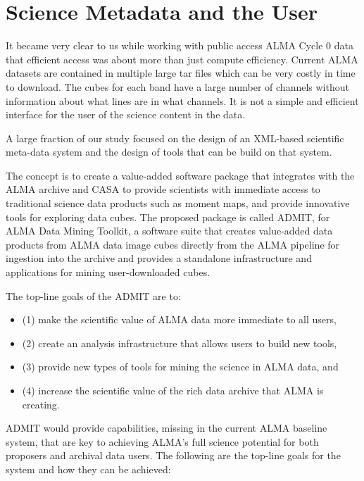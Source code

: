 \section{Science Metadata and the User}

It became very clear to us while
working with public access ALMA Cycle 0 data that efficient
access was about more than just compute efficiency. Current
ALMA datasets are contained in multiple large tar files which
can be very costly in time to download. The cubes for each band
have a large number of channels without information about what
lines are in what channels. It is not a simple and efficient
interface for the user of the science content in the data.

A large fraction of our study focused on the design of an
XML-based scientific meta-data system and the design of
tools that can be build on that system.

The concept is to create a value-added software package that integrates with the ALMA 
archive and CASA to provide scientists with immediate access to traditional science 
data products such as moment maps, and provide innovative tools for exploring data cubes. 
The proposed package is called ADMIT, for ALMA Data Mining Toolkit, a software suite 
that creates value-added data products from ALMA data image cubes directly from the 
ALMA pipeline for ingestion into the archive and provides a standalone 
infrastructure and applications for mining user-downloaded cubes. 

The top-line goals of the ADMIT are to: 

\begin{itemize}
\item[] (1) make the scientific value of ALMA data more immediate to all users, 
\item[] (2) create an analysis infrastructure that allows users to build new tools,
\item[] (3) provide new types of tools for mining the science in ALMA data, and
\item[] (4) increase the scientific value of the rich data archive that ALMA is creating.
\end{itemize}

ADMIT would provide capabilities, missing in the current ALMA baseline system, 
that are key to achieving ALMA’s full science potential for both proposers and archival data users.  
The following are the top-line goals for the system and how they can be achieved:

